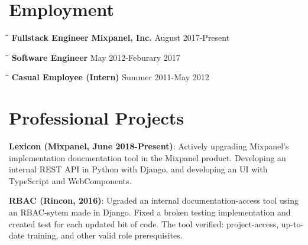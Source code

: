\documentclass{res}
\begin{document}
 
\thispagestyle{empty} %
\address{ksiondag846@gmail.com\\
(520) 329-5081\\
\url{https://github.com/ksiondag}\\
Seattle, WA}


\begin{resume}
   
\section{Employment} 
\vspace{-0.1in} 
  \begin{tabbing}
    \hspace{2.3in}\= \hspace{2.6in}\= \kill
    {\bf Fullstack Engineer} \> {\bf Mixpanel, Inc.}     \>August 2017-Present
  \end{tabbing}\vspace{-5pt}

  \vspace{-20pt}\begin{tabbing}
    \hspace{2.3in}\= \hspace{2.6in}\= \kill
    {\bf Software Engineer}  \> May 2012-Feburary 2017
  \end{tabbing}\vspace{-5pt}
  \vspace{-20pt}\begin{tabbing}
    \hspace{2.3in}\= \hspace{2.6in}\= \kill
    {\bf Casual Employee (Intern)}  \> Summer 2011-May 2012
  \end{tabbing}\vspace{-5pt}

\section{Professional Projects}
  {\bf Lexicon (Mixpanel, June 2018-Present)}: Actively upgrading Mixpanel's implementation doucmentation tool
  in the Mixpanel product. Developing an internal REST API in Python with Django, and developing an UI with
  TypeScript and WebComponents.

  {\bf RBAC (Rincon, 2016)}: Ugraded an internal documentation-access tool using an RBAC-sytem made in Django.
  Fixed a broken testing implementation and created test for each updated bit of code. The tool
  verified: project-access, up-to-date training, and other valid role prerequisites. 


\end{resume}
\end{document}
